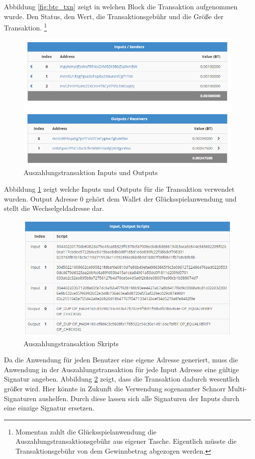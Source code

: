 Abbildung \ref{fig:btc_txn} zeigt in welchen Block die Transaktion aufgenommen wurde. Den Status, den Wert, die Transaktionsgebühr und die Größe der Transaktion.
\footnote{Momentan zahlt die Glücksspielanwendung die Auszahlungstransaktionsgebühr aus eigener Tasche. Eigentlich müsste die Transaktionsgebühr von dem Gewinnbetrag abgezogen werden.}

\begin{figure}[H]
\centering
\includegraphics[width=1\linewidth]{Figures/btc_gui/btc_txn_input_output}
\decoRule
\caption{Auszahlungstransaktion Inputs und Outputs}
\label{fig:btc_txn_input_output}
\end{figure}


Abbildung \ref{fig:btc_txn_input_output} zeigt welche Inputs und Outputs für die Transaktion verwendet wurden. Output Adresse 0 gehört dem Wallet der Glücksspielanwendung und stellt die Wechselgeldadresse dar.


\begin{figure}[H]
\centering
\includegraphics[width=1\linewidth]{Figures/btc_gui/btc_txn_input_output_scripts}
\decoRule
\caption{Auszahlungstransaktion Skripts}
\label{fig:btc_txn_input_output_scripts}
\end{figure}

Da die Anwendung für jeden Benutzer eine eigene Adresse generiert, muss die Anwendung in der Auszahlungstransaktion für jede Input Adresse eine gültige Signatur angeben. Abbildung \ref{fig:btc_txn_input_output_scripts} zeigt, dass die Transaktion dadurch wesentlich größer wird. Hier könnte in Zukunft die Verwendung sogenannter Schnorr Multi-Signaturen aushelfen. Durch diese lassen sich alle Signaturen der Inputs durch eine einzige Signatur ersetzen. \citep{schnorr_sig}